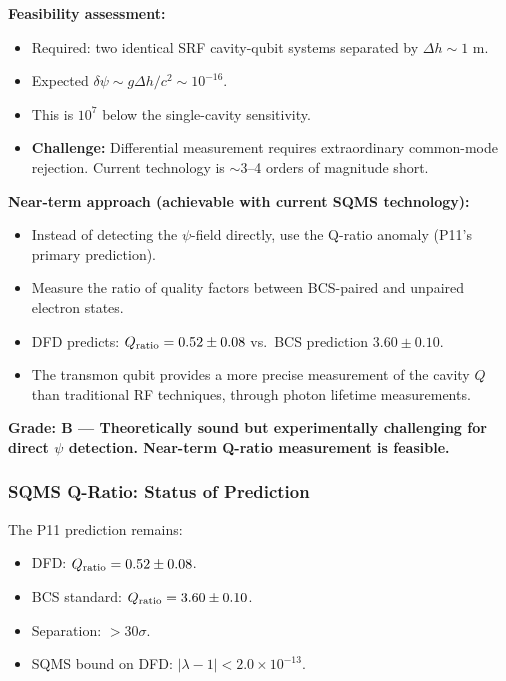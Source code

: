 \documentclass[11pt]{article}
\newcommand{\ee}[1]{\times 10^{#1}}
\begin{document}
\begin{tcolorbox}[colback=red!5!white, colframe=red!70!black,
  title=\textbf{NEW: P11 Transmon-Qubit $\psi$-Probe Experimental Concept}]
\textbf{Feasibility assessment:}
\begin{itemize}
  \item Required: two identical SRF cavity-qubit systems separated
    by $\Delta h \sim 1$ m.
  \item Expected $\delta\psi \sim g\Delta h/c^2 \sim 10^{-16}$.
  \item This is $10^7$ below the single-cavity sensitivity.
  \item \textbf{Challenge:} Differential measurement requires
    extraordinary common-mode rejection. Current technology is
    $\sim 3$--4 orders of magnitude short.
\end{itemize}

\textbf{Near-term approach (achievable with current SQMS technology):}
\begin{itemize}
  \item Instead of detecting the $\psi$-field directly, use the
    Q-ratio anomaly (P11's primary prediction).
  \item Measure the ratio of quality factors between BCS-paired and
    unpaired electron states.
  \item DFD predicts: $Q_{\rm ratio} = 0.52 \pm 0.08$ vs.\ BCS
    prediction $3.60 \pm 0.10$.
  \item The transmon qubit provides a more precise measurement of
    the cavity $Q$ than traditional RF techniques, through photon
    lifetime measurements.
\end{itemize}

\textbf{Grade: B --- Theoretically sound but experimentally
challenging for direct $\psi$ detection. Near-term Q-ratio
measurement is feasible.}

\end{tcolorbox}

\subsubsection{SQMS Q-Ratio: Status of Prediction}

The P11 prediction remains:
\begin{itemize}
  \item DFD: $Q_{\rm ratio} = 0.52 \pm 0.08$.
  \item BCS standard: $Q_{\rm ratio} = 3.60 \pm 0.10$.
  \item Separation: $> 30\sigma$.
  \item SQMS bound on DFD: $|\lambda - 1| < 2.0\ee{-13}$.
\end{itemize}
\end{document}
